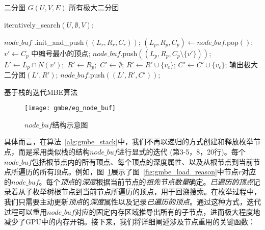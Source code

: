 \begin{algorithm} [H]
  \begin{algorithmic}[1]
    \normalsize
    \REQUIRE 二分图 $G(U,V,E)$
    \ENSURE 所有极大二分团
    
    \renewcommand{\algorithmicwhile}{\textbf{procedure}}
    \renewcommand{\algorithmicdo}{\textbf{:}}
    \STATE \textsf{iteratively\_search}$(U,\emptyset,V)$;

    \renewcommand{\algorithmicwhile}{\textbf{while}}
    \renewcommand{\algorithmicdo}{\textbf{do}}
      \STATE $node\_buf$ \textsf{.init\_and\_push}$((L_r,R_r,C_r))$;
        \STATE $(L_p, R_p, C_p) \leftarrow node\_buf$\textsf{.pop}$()$;
          \STATE $v' \leftarrow C_p$ 中编号最小的顶点; 
          \STATE $node\_buf$\textsf{.push}$((L_p,R_p,C_p \setminus \{v'\} ))$;
          \STATE $L' \leftarrow L_p \cap N(v');$ $R'\leftarrow R_p;$ $C' \leftarrow \emptyset$;
              \STATE $R' \leftarrow R' \cup \{v_c\}$;
              \STATE $C' \leftarrow C' \cup \{v_c\}$;
            \ENDIF
          \ENDFOR
        \ENDIF
          \STATE 输出极大二分团$(L', R')$;
          \STATE $node\_buf$\textsf{.push}$((L',R',C'))$;
        \ENDIF
      \ENDWHILE
    \ENDWHILE

  \end{algorithmic}
  \caption{基于栈的迭代MBE算法}
  \label{alg:gmbe_stack}
\end{algorithm}


\begin{figure} [H]
  \center
    \vspace{-0.1in}
    \texttt{[image: gmbe/eg\_node\_buf]}
    \vspace{0.1in}
  \caption{$node\_buf$结构示意图}
  \label{fig:gmbe_node_buf}
\end{figure}


具体而言，在算法~\ref{alg:gmbe_stack}中，我们不再以递归的方式创建和释放枚举节点，而是采用类似栈的结构$node\_buf$进行显式的迭代 (第3-5，8，20行)。每个$node\_buf$包括根节点内的所有顶点、每个顶点的深度属性、以及从根节点到当前节点所遍历的所有顶点。例如，图~\ref{fig:gmbe_node_buf}展示了图~\ref{fig:gmbe_load_reason}中节点$r$对应的$node\_buf$。每个\textit{顶点}的\emph{\textit{深度}}根据当前节点的\emph{祖先节点数量}确定。\textit{已遍历的顶点}记录着从子枚举树根节点到当前节点所遍历的顶点，用于回溯搜索。在枚举过程中，我们只需要主动更新\textit{顶点}的\textit{深度}属性以及记录\textit{已遍历的顶点}。通过这种方式，迭代过程可以重用$node\_buf$对应的固定内存区域推导出所有的子节点，进而极大程度地减少了GPU中的内存开销。接下来，我们将详细阐述涉及节点重用的关键函数：



